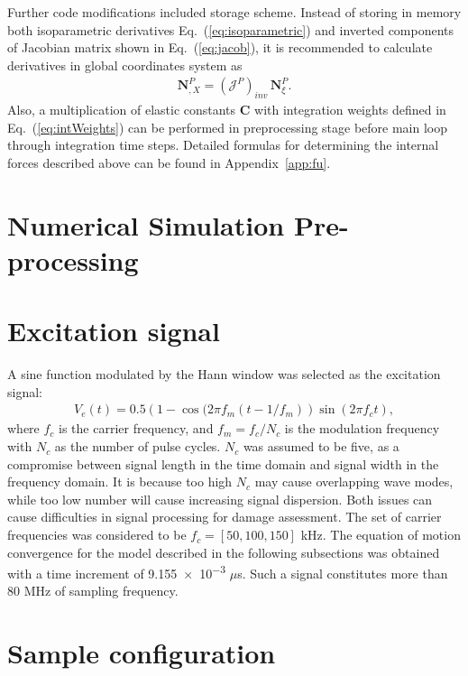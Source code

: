 \documentclass[a4paper,fleqn]{cas-dc}
\begin{document}
Further code modifications included storage scheme.
Instead of storing in memory both isoparametric derivatives Eq.~(\ref{eq:isoparametric}) and inverted components of Jacobian matrix shown in Eq.~(\ref{eq:jacob}), it is recommended to calculate derivatives in global coordinates system as
\begin{eqnarray}
	\textbf{N}^P_{,X} = \left(\mathcal{J}^P\right)_{inv}\,\textbf{N}^P_{\xi}.
\end{eqnarray}
Also, a multiplication of elastic constants \(\textbf{C}\) with integration weights defined in Eq.~(\ref{eq:intWeights}) can be performed in preprocessing stage before main loop through integration time steps.
Detailed formulas for determining the internal forces described above can be found in Appendix~\ref{app:fu}.
\section{Numerical Simulation Pre-processing}
\section{Excitation signal}
\label{sec:excitation}

A sine function modulated by the Hann window was selected as the excitation signal:
\begin{eqnarray}
	V_e(t) = 0.5\left(1-\cos(2\pi f_m(t-1/f_m)\right)\sin(2\pi f_ct),
\end{eqnarray}
where \(f_c\) is the carrier frequency, and \(f_m=f_c/N_c\) is the modulation frequency with \(N_c\) as the number of pulse cycles.
\(N_c\) was assumed to be five, as a compromise between signal length in the time domain and signal width in the frequency domain.
It is because too high \(N_c\) may cause overlapping wave modes, while too low number will cause increasing signal dispersion.
Both issues can cause difficulties in signal processing for damage assessment.
The set of carrier frequencies was considered to be \(f_c=[50, 100, 150] \) \unit{\kHz}.
The equation of motion convergence for the model described in the following subsections was obtained with a time increment of \num{9.155e-3} \(\mu\)s.
Such a signal constitutes more than 80 \unit{\MHz} of sampling frequency.
\section{Sample configuration}
\label{sec:sample}
\end{document}

